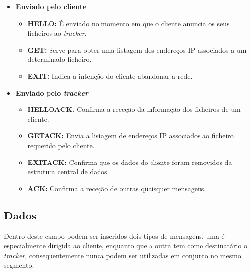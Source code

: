         \begin{itemize}

            \item \textbf{Enviado pelo cliente}
                
            \begin{itemize}
                
                \item \textbf{HELLO:} É enviado no momento em que o cliente anuncia os seus ficheiros ao \textit{tracker}. 
    
                \item \textbf{GET:} Serve para obter uma listagem dos endereços IP associados a um determinado ficheiro. 
    
                \item \textbf{EXIT:} Indica a intenção do cliente abandonar a rede.
            
            \end{itemize}

            \newpage
            \item \textbf{Enviado pelo \textit{tracker}}

            \begin{itemize}
                
                \item \textbf{HELLOACK:} Confirma a receção da informação dos ficheiros de um cliente.

                \item \textbf{GETACK:} Envia a listagem de endereços IP associados ao ficheiro requerido pelo cliente.

                \item \textbf{EXITACK:} Confirma que os dados do cliente foram removidos da estrutura central de dados.

                \item \textbf{ACK:} Confirma a receção de outras quaisquer mensagens.
            
            \end{itemize}
            
        \end{itemize}

    \subsection{Dados}

        Dentro deste campo podem ser inseridos dois tipos de mensagens, uma é especialmente dirigida ao cliente, enquanto que a outra tem como destinatário o \textit{tracker}, consequentemente nunca podem ser utilizadas em conjunto no mesmo segmento.

